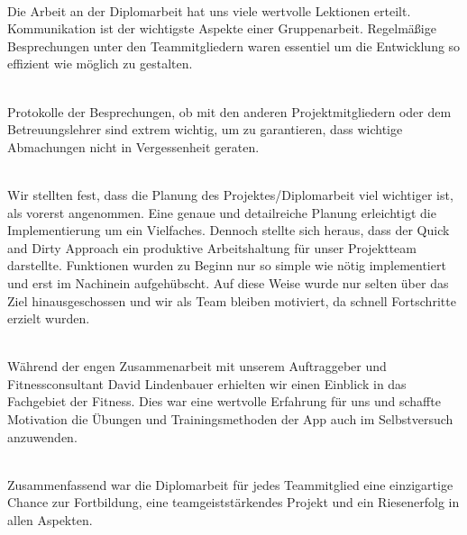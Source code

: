\documentclass[FIPLY_base.tex]{subfiles}
\begin{document}
\ \\
Die Arbeit an der Diplomarbeit hat uns viele wertvolle Lektionen erteilt.
Kommunikation ist der wichtigste Aspekte einer Gruppenarbeit. 
Regelmäßige Besprechungen unter den Teammitgliedern waren essentiel um die Entwicklung so effizient wie möglich zu gestalten.

\ \\
Protokolle der Besprechungen, ob mit den anderen Projektmitgliedern oder dem Betreuungslehrer sind extrem wichtig, um zu garantieren, dass wichtige Abmachungen nicht in Vergessenheit geraten.

\ \\
Wir stellten fest, dass die Planung des Projektes/Diplomarbeit viel wichtiger ist, als vorerst angenommen. 
Eine genaue und detailreiche Planung erleichtigt die Implementierung um ein Vielfaches.
Dennoch stellte sich heraus, dass der \grqq{}Quick and Dirty Approach\grqq{} ein produktive Arbeitshaltung für unser Projektteam darstellte.
Funktionen wurden zu Beginn nur so simple wie nötig implementiert und erst im Nachinein aufgehübscht.
Auf diese Weise wurde nur selten über das Ziel hinausgeschossen und wir als Team bleiben motiviert, da schnell Fortschritte erzielt wurden. 

\ \\
Während der engen Zusammenarbeit mit unserem Auftraggeber und Fitnessconsultant David Lindenbauer erhielten wir einen Einblick in das Fachgebiet der Fitness. Dies war eine wertvolle Erfahrung für uns und schaffte Motivation die Übungen und Trainingsmethoden der App auch im Selbstversuch anzuwenden.

\ \\
Zusammenfassend war die Diplomarbeit für jedes Teammitglied eine einzigartige Chance zur Fortbildung, eine teamgeiststärkendes Projekt und ein Riesenerfolg in allen Aspekten. 
\end{document}

